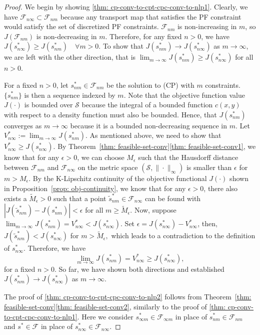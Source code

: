 \documentclass[12pt,leqno]{amsart}
\begin{document}
\begin{proof} 
We begin by showing \ref{thm: cp-conv-to-cpt-cpc-conv-to-nlp1}. Clearly, we have $\mathcal{F}_{n\infty}\subset\mathcal{F}_{nm}$ because any transport map that satisfies the PF constraint would satisfy the set of discretized PF constraints. $\mathcal{F}_{nm}$ is non-increasing in $m$, so $J(\mathcal{F}_{nm})$ is non-decreasing in $m$. Therefore, for any fixed $n>0$, we have $J(s_{n\infty}^*)\geq J(s_{nm}^*)\quad\forall m >0$. 
To show that $J(s_{nm}^*)\rightarrow J(s_{n\infty}^*)$ as $m\rightarrow\infty$, we are left with the other direction, that is $\lim_{m\rightarrow\infty} J(s_{nm}^*)\geq J(s_{n\infty}^*)$ for all $n>0$.
   
For a fixed $n>0$, let $s_{nm}^*\in \mathcal{F}_{nm}$ be the solution to (CP) with $m$ constraints. $\{s_{nm}^*\}$ is then a sequence indexed by $m$. Note that the objective function value $J(\cdot)$ is bounded over $\mathcal{S}$ because the integral of a bounded function $c(x, y)$ with respect to a density function must also be bounded. Hence, that $J(s_{nm}^*)$ converges as  $m\rightarrow\infty$ because it is a bounded non-decreasing sequence in $m$. Let $V_{n\infty}^*:=\lim_{m\rightarrow\infty}J(s_{nm}^*)$. As mentioned above, we need to show that $V_{n\infty}^*\geq J(s_{n\infty}^*)$. By Theorem~\ref{thm: feasible-set-conv}\ref{thm: feasible-set-conv1}, we know that for any $\epsilon>0$, we can choose $M_\epsilon$ such that the Hausdorff distance between $\mathcal{F}_{nm}$ and $\mathcal{F}_{n\infty}$ on the metric space $(\mathcal{S}, \|\cdot\|_{\infty})$ is smaller than $\epsilon$ for $m>M_\epsilon$. By the K-Lipschitz continuity of the objective functional $J(\cdot)$ shown in Proposition~\ref{prop: obj-continuity}, we know that for any $\epsilon>0$, there also exists a $\tilde{M}_{\epsilon}>0$ such that a point $\tilde{s}_{nm}^* \in\mathcal{F}_{n\infty}$ can be  found with $|J(\tilde{s}_{nm}^*)  - J(s_{nm}^*)|<\epsilon$ for all $m\geq \tilde{M}_{\epsilon}$. Now, suppose $\lim_{m\rightarrow\infty}J(s_{nm}^*) =V_{n\infty}^* < J(s_{n\infty}^*)$. Set $\epsilon = J(s_{n\infty}^*)-V_{n\infty}^*$, then, $J(\tilde{s}_{nm}^*)< J(s_{n\infty}^*)$ for $m > \tilde{M}_{\epsilon},$ 
which leads to a contradiction to the definition of $s_{n\infty}^*$.
Therefore, we have
\[\lim_{m\rightarrow\infty} J(s_{nm}^*)=V_{n\infty}^*\geq J(s_{n\infty}^*),
\]
for a fixed $n>0$.
So far, we have shown both directions and established 
$J(s_{nm}^*)\rightarrow J(s_{n\infty}^*)$ as $m\rightarrow\infty$.
 
The proof of \ref{thm: cp-conv-to-cpt-cpc-conv-to-nlp2} follows from Theorem~\ref{thm: feasible-set-conv}\ref{thm: feasible-set-conv2}, similarly to the proof of \ref{thm: cp-conv-to-cpt-cpc-conv-to-nlp1}. Here we consider $s_{\infty m}^*\in\mathcal{F}_{\infty m}$ in place of $s_{nm}^*\in\mathcal{F}_{nm}$ and $s^*\in\mathcal{F}$ in place of $s_{n\infty}^*\in\mathcal{F}_{n\infty}$.
\end{proof}
\end{document}
